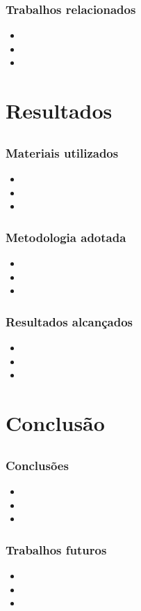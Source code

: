 \documentclass[aspectratio=169]{beamer} %
\begin{document}
\begin{frame}
	\frametitle{Trabalhos relacionados}

	\begin{itemize}
		\item
		\item
		\item
	\end{itemize}
\end{frame}

\section{Resultados}
\subsection*{}

\begin{frame}
	\frametitle{Materiais utilizados}

	\begin{itemize}
		\item
		\item
		\item
	\end{itemize}
\end{frame}

\begin{frame}
	\frametitle{Metodologia adotada}

	\begin{itemize}
		\item
		\item
		\item
	\end{itemize}
\end{frame}

\begin{frame}
	\frametitle{Resultados alcan\c cados}

	\begin{itemize}
		\item
		\item
		\item
	\end{itemize}
\end{frame}

\section{Conclusão}
\subsection*{}

\begin{frame}
	\frametitle{Conclusões}

	\begin{itemize}
		\item
		\item
		\item
	\end{itemize}
\end{frame}

\begin{frame}
	\frametitle{Trabalhos futuros}

	\begin{itemize}
		\item
		\item
		\item
	\end{itemize}
\end{frame}
\end{document}
